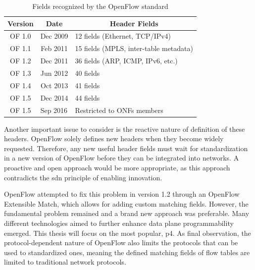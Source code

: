 \begin{table}[tbp]
	\centering
    \begin{tabular}{|c|c|l|}
    \hline
    \rowcolor[HTML]{EFEFEF} 
    \textbf{Version} & \textbf{Date}                 & \multicolumn{1}{c|}{\cellcolor[HTML]{EFEFEF}\textbf{Header Fields}} \\ \hline
    OF 1.0 & Dec 2009 & 12 fields (Ethernet, TCP/IPv4)         \\ \hline
    OF 1.1 & Feb 2011 & 15 fields (MPLS, inter-table metadata) \\ \hline
    OF 1.2 & Dec 2011 & 36 fields (ARP, ICMP, IPv6, etc.)      \\ \hline
    OF 1.3 & Jun 2012 & 40 fields                              \\ \hline
    OF 1.4 & Oct 2013 & 41 fields                              \\ \hline
    OF 1.5 & Dec 2014 & 44 fields                              \\ \hline
    OF 1.5           & \multicolumn{1}{l|}{Sep 2016} & Restricted to ONFs members                                          \\ \hline
    \end{tabular}
    \caption{Fields recognized by the OpenFlow standard\cite{bosshart_p4_2014}}
    \label{tb:openflow_version_fields}
\end{table}

Another important issue to consider is the reactive nature of definition of these headers. OpenFlow solely defines new headers when they become widely requested. Therefore, any new useful header fields must wait for standardization in a new version of OpenFlow before they can be integrated into networks. A proactive and open approach would be more appropriate, as this approach contradicts the \gls{sdn} principle of enabling innovation\cite{li_protocol_2017}. 

OpenFlow attempted to fix this problem in version 1.2 through an OpenFlow Extensible Match, which allows for adding custom matching fields\cite{kreutz_software-defined_2015}. However, the fundamental problem remained and a brand new approach was preferable. Many different technologies aimed to further enhance data plane programmability emerged. This thesis will focus on the most popular, \gls{p4}.
As final observation, the protocol-dependent nature of OpenFlow also limits the protocols that can be used to standardized ones, meaning the defined matching fields of flow tables are limited to traditional network protocols. 


